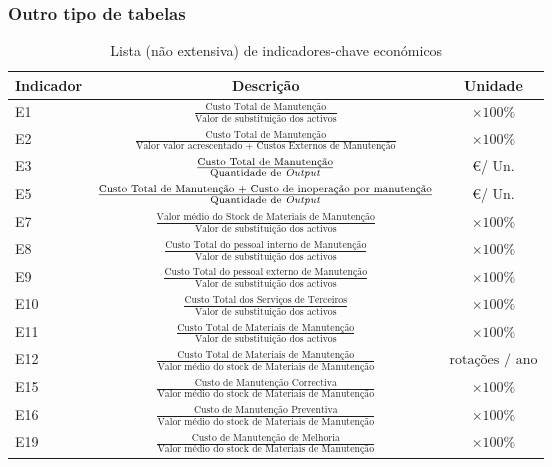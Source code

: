 \subsubsection{Outro tipo de tabelas}\label{outrotabelas}
\begin{table} [h!]
	\begin{center}
       
	\begin{tabular}{lcc}
	\toprule
	Indicador & Descrição & Unidade \\
	\midrule
	E1 & $\frac{\text{Custo Total de Manutenção}}{\text{Valor de substituição dos activos}}$ & $\times 100\%$ \\
	E2 & $\frac{\text{Custo Total de Manutenção}}{\text{Valor valor acrescentado + Custos Externos de Manutenção}}$ & $\times 100\%$ \\
	E3 & $\frac{\text{Custo Total de Manutenção}}{\text{Quantidade de \textit{Output}}}$ & \euro / Un. \\
	E5 & $\frac{\text{Custo Total de Manutenção + Custo de inoperação por manutenção}}{\text{Quantidade de \textit{Output}}}$ & \euro / Un. \\
	E7 & $\frac{\text{Valor médio do Stock de Materiais de Manutenção}}{\text{Valor de substituição dos activos}}$ & $\times 100\%$ \\
	E8 & $\frac{\text{Custo Total do pessoal interno de Manutenção}}{\text{Valor de substituição dos activos}}$ & $\times 100\%$ \\
	E9 & $\frac{\text{Custo Total do pessoal externo de Manutenção}}{\text{Valor de substituição dos activos}}$ & $\times 100\%$ \\
	E10 & $\frac{\text{Custo Total dos Serviços de Terceiros}}{\text{Valor de substituição dos activos}}$ & $\times 100\%$ \\
	E11 & $\frac{\text{Custo Total de Materiais de Manutenção}}{\text{Valor de substituição dos activos}}$ & $\times 100\%$ \\
	E12 & $\frac{\text{Custo Total de Materiais de Manutenção}}{\text{Valor médio do stock de Materiais de Manutenção}}$ & $\text{rotações / ano}$ \\
	E15 & $\frac{\text{Custo de Manutenção Correctiva}}{\text{Valor médio do stock de Materiais de Manutenção}}$ & $\times 100\%$ \\
	E16 & $\frac{\text{Custo de Manutenção Preventiva}}{\text{Valor médio do stock de Materiais de Manutenção}}$ & $\times 100\%$ \\
	E19 & $\frac{\text{Custo de Manutenção de Melhoria}}{\text{Valor médio do stock de Materiais de Manutenção}}$ & $\times 100\%$ \\

	\bottomrule

	\end{tabular}
    \caption[Lista (não extensiva) de indicadores-chave económicos]{Lista (não extensiva) de indicadores-chave económicos}              
	\label{tab:indicadore_economicos}
    \end{center}
\end{table}



